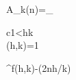 A_{k}(n)=\sum_{\begin{subarray}{c}1<h\leq k\\
\left(h,k\right)=1\end{subarray}}{^{\pi{}f(h,k)-(2\pi{}nh/k)}}